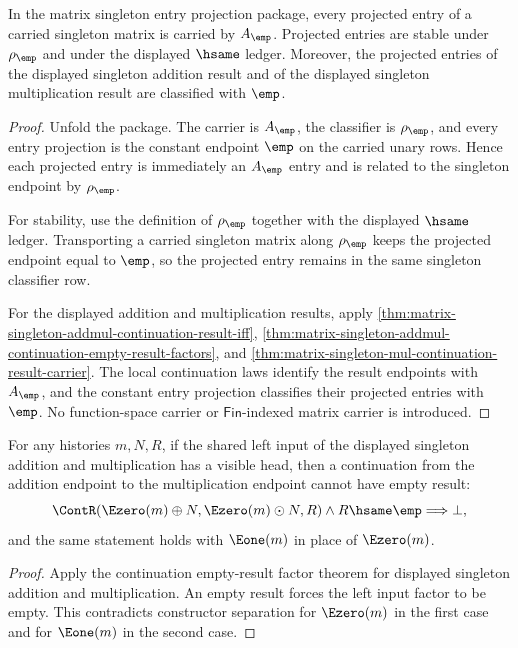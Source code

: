 \begin{theorem}
\label{thm:matrix-singleton-entry-projection-laws}
In the matrix singleton entry projection package, every projected entry of a
carried singleton matrix is carried by $A_{\emp}$. Projected entries are stable
under $\rho_{\emp}$ and under the displayed $\hsame$ ledger. Moreover, the
projected entries of the displayed singleton addition result and of the
displayed singleton multiplication result are classified with $\emp$.
\end{theorem}
\begin{proof}
Unfold the package. The carrier is $A_{\emp}$, the classifier is
$\rho_{\emp}$, and every entry projection is the constant endpoint $\emp$ on
the carried unary rows. Hence each projected entry is immediately an
$A_{\emp}$ entry and is related to the singleton endpoint by $\rho_{\emp}$.

For stability, use the definition of $\rho_{\emp}$ together with the displayed
$\hsame$ ledger. Transporting a carried singleton matrix along $\rho_{\emp}$
keeps the projected endpoint equal to $\emp$, so the projected entry remains in
the same singleton classifier row.

For the displayed addition and multiplication results, apply
\autoref{thm:matrix-singleton-addmul-continuation-result-iff},
\autoref{thm:matrix-singleton-addmul-continuation-empty-result-factors}, and
\autoref{thm:matrix-singleton-mul-continuation-result-carrier}. The local
continuation laws identify the result endpoints with $A_{\emp}$, and the
constant entry projection classifies their projected entries with $\emp$. No
function-space carrier or $\mathsf{Fin}$-indexed matrix carrier is introduced.
\end{proof}

\begin{theorem}
\label{thm:matrix-singleton-addmul-visible-left-continuation-result-nonempty}
For any histories $m,N,R$, if the shared left input of the displayed singleton
addition and multiplication has a visible head, then a continuation from the
addition endpoint to the multiplication endpoint cannot have empty result:
$$
\ContR(\Ezero(m)\oplus N,\Ezero(m)\odot N,R)\land R\hsame\emp
\Longrightarrow\bot,
$$
and the same statement holds with $\Eone(m)$ in place of $\Ezero(m)$.
\end{theorem}
\begin{proof}
Apply the continuation empty-result factor theorem for displayed singleton
addition and multiplication. An empty result forces the left input factor to
be empty. This contradicts constructor separation for $\Ezero(m)$ in the first
case and for $\Eone(m)$ in the second case.
\end{proof}

